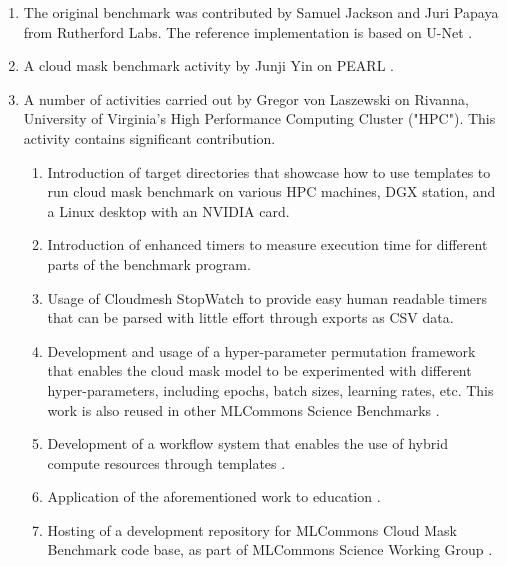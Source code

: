 \documentclass[sigplan,screen]{acmart}
\begin{document}
\begin{enumerate}
\item The original benchmark was contributed by Samuel Jackson and Juri Papaya \cite{Thiyagalingam2022AIBF,jackson-2020-eu} from Rutherford Labs.
The reference implementation is based on U-Net \cite{Ronneberger2015UNetCN}. 

\item A cloud mask benchmark activity by Junji Yin on PEARL \cite{Thiyagalingam2022AIBF}.

\item A number of activities carried out by Gregor von Laszewski on Rivanna, University of Virginia's High Performance Computing Cluster ("HPC"). This activity contains significant contribution. 

    \begin{enumerate} 

    \item Introduction of target directories that showcase how to use templates to run cloud mask benchmark on various HPC machines, DGX station, and a Linux desktop with an NVIDIA card.

    \item Introduction of enhanced timers to measure execution time for different parts of the benchmark program.

    \item Usage of Cloudmesh StopWatch to provide easy human readable timers that can be parsed with little effort through exports as CSV data.

    \item Development and usage of a hyper-parameter permutation framework that enables the cloud mask model to be experimented with different hyper-parameters, including epochs, batch sizes, learning rates, etc. This work is also reused in other MLCommons Science Benchmarks \cite{las22-cloudmesh-cc-reu}.

    \item Development of a workflow system that enables the use of hybrid compute resources through templates \cite{las-2023-escience-cloudmask}.

    \item Application of the aforementioned work to education \cite{las-2023-mlcommons-edu-eq}.

    \item Hosting of a development repository for MLCommons Cloud Mask Benchmark code base, as part of MLCommons Science Working Group \cite{github-laszewsk-mlcommons}.


\end{enumerate}
\end{enumerate}
\end{document}
